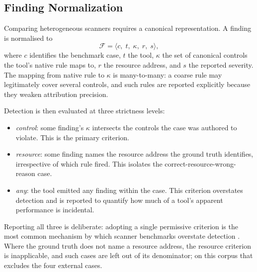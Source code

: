 \documentclass[smallextended]{svjour3}
\begin{document}
\subsection{Finding Normalization}
\label{sec:normalization}
Comparing heterogeneous scanners requires a canonical representation. A finding
is normalised to
\begin{equation}
\mathcal{F} = \langle c,\; t,\; \kappa,\; r,\; s \rangle,
\end{equation}
where $c$ identifies the benchmark case, $t$ the tool, $\kappa$ the set of
canonical controls the tool's native rule maps to, $r$ the resource address, and
$s$ the reported severity. The mapping from native rule to $\kappa$ is
many-to-many: a coarse rule may legitimately cover several controls, and such
rules are reported explicitly because they weaken attribution precision.

Detection is then evaluated at three strictness levels:
\begin{itemize}
\item \emph{control}: some finding's $\kappa$ intersects the controls the case
was authored to violate. This is the primary criterion.
\item \emph{resource}: some finding names the resource address the ground truth
identifies, irrespective of which rule fired. This isolates the
correct-resource-wrong-reason case.
\item \emph{any}: the tool emitted any finding within the case. This criterion
overstates detection and is reported to quantify how much of a tool's apparent
performance is incidental.
\end{itemize}
Reporting all three is deliberate: adopting a single permissive criterion is the
most common mechanism by which scanner benchmarks overstate detection
\citep{habib2018howmany}. Where the ground truth does not name a resource
address, the resource criterion is inapplicable, and such cases are left out of
its denominator; on this corpus that excludes the four external cases.
\end{document}
